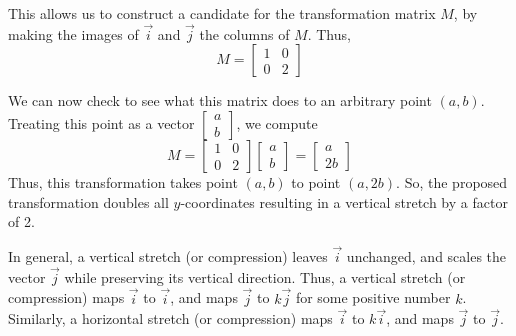 \documentclass{ximera}
\begin{document}
\begin{exploration}
\begin{center}
  \quad\quad
 \end{center}

 This allows us to construct a candidate for the transformation matrix $M$, by making the images of $\vec{i}$ and $\vec{j}$ the columns of $M$.  Thus, 
$$M=\begin{bmatrix}
1 & 0\\
0 & 2
\end{bmatrix}$$

We can now check to see what this matrix does to an arbitrary point $(a, b)$.  Treating this point as a vector $\begin{bmatrix}a\\b\end{bmatrix}$, we compute
$$M=\begin{bmatrix}
1 & 0\\
0 & 2
\end{bmatrix}\begin{bmatrix}a\\b\end{bmatrix}=\begin{bmatrix}a\\2b\end{bmatrix}$$
 Thus, this transformation takes point $(a, b)$ to point $(a, 2b)$.  So, the proposed transformation doubles all $y$-coordinates resulting in a vertical stretch by a factor of 2.
\end{exploration}






 In general, a vertical stretch (or compression) leaves $\vec{i}$ unchanged, and scales the vector $\vec{j}$ while preserving its vertical direction.  Thus, a vertical stretch (or compression) maps $\vec{i}$ to $\vec{i}$, and maps $\vec{j}$ to $k\vec{j}$ for some positive number $k$.  Similarly, a horizontal stretch (or compression) maps $\vec{i}$ to $k\vec{i}$, and maps $\vec{j}$ to $\vec{j}$.
\end{document}
